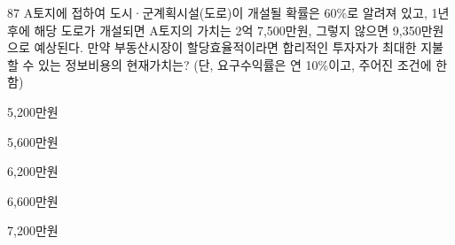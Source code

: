 \begin{question}{87}
A토지에 접하여 도시·군계획시설(도로)이 개설될 확률은 60\%로 알려져 있고, 1년 후에 해당 도로가 개설되면 A토지의 가치는 2억 7,500만원, 그렇지 않으면 9,350만원으로 예상된다. 만약 부동산시장이 할당효율적이라면 합리적인 투자자가 최대한 지불할 수 있는 정보비용의 현재가치는? (단, 요구수익률은 연 10\%이고, 주어진 조건에 한함)
\begin{choices}
  \item 5,200만원
  \item 5,600만원
  \item 6,200만원
  \item 6,600만원
  \item 7,200만원
\end{choices}
\end{question}
